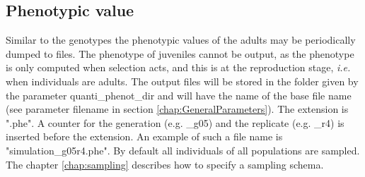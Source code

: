\documentclass[letterpaper,12pt,oneside]{book}
\begin{document}
\subsection{Phenotypic value}\label{phenoQuanti}
Similar to the genotypes the phenotypic values of the adults may be periodically dumped to files. The phenotype of juveniles cannot be output, as the phenotype is only computed when selection acts, and this is at the reproduction stage, \textit{i.e.} when individuals are adults. The output files will be stored in the folder given by the parameter \textsf{quanti\_phenot\_dir} and will have the name of the base file name (see parameter \textsf{filename} in section \ref{chap:GeneralParameters}). The extension is ".phe". A counter for the generation (e.g. \_g05) and the replicate (e.g. \_r4) is inserted before the extension. An example of such a file name is \textsf{"simulation\_g05r4.phe"}. By default all individuals of all populations are sampled. The chapter \ref{chap:sampling} describes how to specify a sampling schema.
\end{document}
